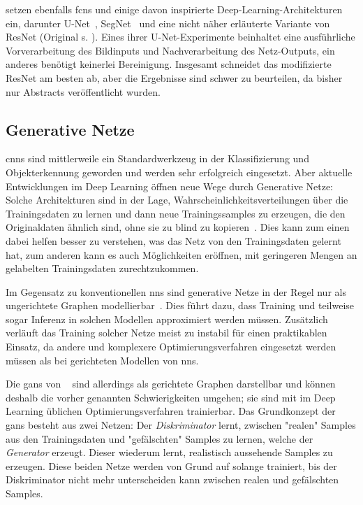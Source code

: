 \citeauthor{Wang.2018c} \cite{Wang.2018d,Wang.2018b,Wang.2018,Wang.2018c} setzen ebenfalls \glspl{fcn} und einige davon inspirierte Deep-Learning-Architekturen ein, darunter U-Net~\cite{Ronneberger.2015}, SegNet~\cite{Badrinarayanan.2017} und eine nicht näher erläuterte Variante von ResNet (Original s. \cite{He.2016}).
Eines ihrer U-Net-Experimente beinhaltet eine ausführliche Vorverarbeitung des Bildinputs und Nachverarbeitung des Netz-Outputs, ein anderes benötigt keinerlei Bereinigung.
Insgesamt schneidet das modifizierte ResNet am besten ab, aber die Ergebnisse sind schwer zu beurteilen, da bisher nur Abstracts veröffentlicht wurden.



\subsection{Generative Netze}

\glspl{cnn} sind mittlerweile ein Standardwerkzeug in der Klassifizierung und Objekterkennung geworden und werden sehr erfolgreich eingesetzt.
Aber aktuelle Entwicklungen im Deep Learning öffnen neue Wege durch Generative Netze:
Solche Architekturen sind in der Lage, Wahrscheinlichkeitsverteilungen über die Trainingsdaten zu lernen und dann neue Trainingssamples zu erzeugen, die den Originaldaten ähnlich sind, ohne sie zu blind zu kopieren~\cite{Goodfellow.2016}.
Dies kann zum einen dabei helfen besser zu verstehen, was das Netz von den Trainingsdaten gelernt hat, zum anderen kann es auch Möglichkeiten eröffnen, mit geringeren Mengen an gelabelten Trainingsdaten zurechtzukommen\cite{Kingma.2014}.

Im Gegensatz zu konventionellen \glspl{nn} sind generative Netze in der Regel nur als ungerichtete Graphen modellierbar~\cite{Goodfellow.2016}.
Dies führt dazu, dass Training und teilweise sogar Inferenz in solchen Modellen approximiert werden müssen.
Zusätzlich verläuft das Training solcher Netze meist zu instabil für einen praktikablen Einsatz, da andere und komplexere Optimierungsverfahren eingesetzt werden müssen als bei gerichteten Modellen von \glspl{nn}.

Die \glspl{gan} von \citeauthor{Goodfellow.2014}~\cite{Goodfellow.2014} sind allerdings als gerichtete Graphen darstellbar und können deshalb die vorher genannten Schwierigkeiten umgehen; sie sind mit im Deep Learning üblichen Optimierungsverfahren trainierbar.
Das Grundkonzept der \glspl{gan} besteht aus zwei Netzen:
Der \emph{Diskriminator} lernt, zwischen "realen" Samples aus den Trainingsdaten und "gefälschten" Samples zu lernen, welche der \emph{Generator} erzeugt.
Dieser wiederum lernt, realistisch aussehende Samples zu erzeugen.
Diese beiden Netze werden von Grund auf solange trainiert, bis der Diskriminator nicht mehr unterscheiden kann zwischen realen und gefälschten Samples.

